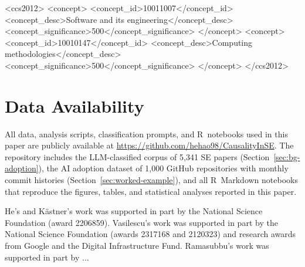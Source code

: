 \documentclass[manuscript,screen,review]{acmart}
\begin{document}
\begin{CCSXML}
  <ccs2012>
     <concept>
         <concept_id>10011007</concept_id>
         <concept_desc>Software and its engineering</concept_desc>
         <concept_significance>500</concept_significance>
         </concept>
     <concept>
         <concept_id>10010147</concept_id>
         <concept_desc>Computing methodologies</concept_desc>
         <concept_significance>500</concept_significance>
         </concept>
   </ccs2012>
\end{CCSXML}




\maketitle









\section*{Data Availability}
\label{sec:data-availability}

All data, analysis scripts, classification prompts, and R~notebooks used in this paper are publicly available at \url{https://github.com/hehao98/CausalityInSE}.
The repository includes the LLM-classified corpus of 5,341 SE papers (Section~\ref{sec:bg-adoption}), the AI adoption dataset of 1,000 GitHub repositories with monthly commit histories (Section~\ref{sec:worked-example}), and all R~Markdown notebooks that reproduce the figures, tables, and statistical analyses reported in this paper.

\begin{acks}
  He's and Kästner's work was supported in part by the National Science Foundation (award 2206859).
  Vasilescu's work was supported in part by the National Science Foundation (awards 2317168 and 2120323) and research awards from Google and the Digital Infrastructure Fund.
  Ramasubbu's work was supported in part by ...
\end{acks}




\appendix


\end{document}
